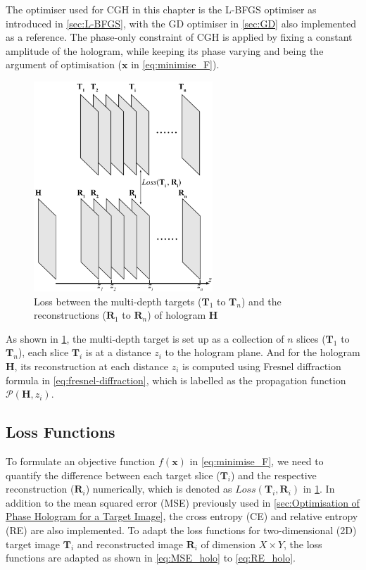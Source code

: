 The optimiser used for CGH in this chapter is the L-BFGS optimiser as introduced in \cref{sec:L-BFGS}, with the GD optimiser in \cref{sec:GD} also implemented as a reference. The phase-only constraint of CGH is applied by fixing a constant amplitude of the hologram, while keeping its phase varying and being the argument of optimisation ($\textbf{x}$ in \cref{eq:minimise_F}).

\begin{figure}[H]
	\centering
	\includegraphics[width=0.6\textwidth]{Fresnel_slice_illustration}
	\caption{Loss between the multi-depth targets ($\textbf{T}_1$ to $\textbf{T}_n$) and the reconstructions ($\textbf{R}_1$ to $\textbf{R}_n$) of hologram $\textbf{H}$}
	\label{fig:Fresnel_slice_illustration}
\end{figure}

As shown in \cref{fig:Fresnel_slice_illustration}, the multi-depth target is set up as a collection of $n$ slices ($\textbf{T}_1$ to $\textbf{T}_n$), each slice $\textbf{T}_i$ is at a distance $z_i$ to the hologram plane. And for the hologram $\textbf{H}$, its reconstruction at each distance $z_i$ is computed using Fresnel diffraction formula in \cref{eq:fresnel-diffraction}, which is labelled as the propagation function $\mathcal{P}(\textbf{H}, z_i)$.

\subsection{Loss Functions}
To formulate an objective function $f(\textbf{x})$ in \cref{eq:minimise_F}, we need to quantify the difference between each target slice ($\textbf{T}_i$) and the respective reconstruction ($\textbf{R}_i$) numerically, which is denoted as $Loss(\textbf{T}_i, \textbf{R}_i)$ in \cref{fig:Fresnel_slice_illustration}. In addition to the mean squared error (MSE) \cite{MSE_REF} previously used in \cref{sec:Optimisation of Phase Hologram for a Target Image}, the cross entropy (CE) \cite{cybenko1998mathematics} and relative entropy (RE) \cite{Kullback1951} are also implemented. To adapt the loss functions for two-dimensional (2D) target image $\textbf{T}_i$ and reconstructed image $\textbf{R}_i$ of dimension $X\times Y$, the loss functions are adapted as shown in \cref{eq:MSE_holo} to \cref{eq:RE_holo}.

